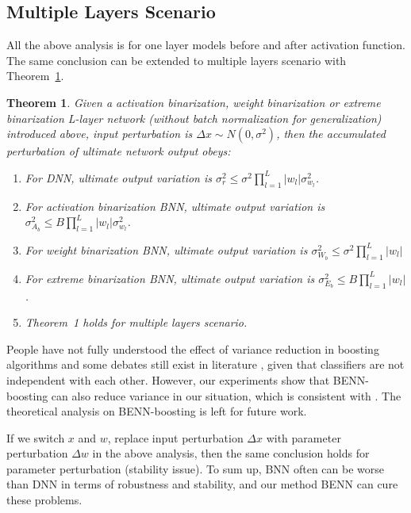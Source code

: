 \documentclass[10pt,twocolumn,letterpaper]{article}
\newtheorem{theorem}{Theorem}
\begin{document}
\subsection{Multiple Layers Scenario}
All the above analysis is for one layer models before and after activation function. The same conclusion can be extended to multiple layers scenario with Theorem~\ref{lm1}.
\begin{theorem}
    \label{lm1}
    Given a activation binarization, weight binarization or extreme binarization L-layer network (without batch normalization for generalization) introduced above, input perturbation is $\Delta x \sim N(0,\sigma^{2})$, then the accumulated perturbation of ultimate network output obeys:
    \begin{enumerate}
        \item For DNN, ultimate output variation is $\sigma_r^2 \leq \sigma^2\prod_{l=1}^{L}|w_l|\sigma_{w_l}^2$.
        \item For activation binarization BNN, ultimate output variation is $\sigma_{A_b}^2\leq B\prod_{l=1}^{L}|w_l|\sigma_{w_l}^2$.
        \item For weight binarization BNN, ultimate output variation is $\sigma_{W_b}^2 \leq \sigma^2\prod_{l=1}^{L}|w_l|$
        \item For extreme binarization BNN, ultimate output variation is $\sigma_{E_b}^2\leq B \prod_{l=1}^{L} |w_l|$.
        \item Theorem~1 holds for multiple layers scenario.
    \end{enumerate}

\end{theorem}

People have not fully understood the effect of variance reduction in boosting algorithms and some debates still exist in literature \cite{buhlmann2007boosting, friedman2000additive}, given that classifiers are not independent with each other. However, our experiments show that BENN-boosting can also reduce variance in our situation, which is consistent with \cite{freund1996experiments, friedman2000additive}. The theoretical analysis on BENN-boosting is left for future work.

If we switch $x$ and $w$, replace input perturbation $\Delta x$ with parameter perturbation $\Delta w$ in the above analysis, then the same conclusion holds for parameter perturbation (stability issue). To sum up, BNN often can be worse than DNN in terms of robustness and stability, and our method BENN can cure these problems.
\end{document}
